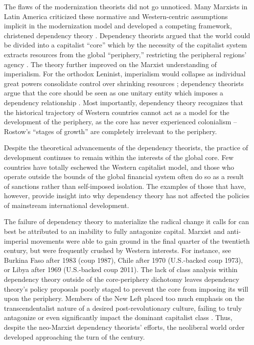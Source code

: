\documentclass{../../../coursework}
\begin{document}
The flaws of the modernization theorists did not go unnoticed. Many Marxists
in Latin America criticized these normative and Western-centric assumptions
implicit in the modernization model and developed a competing framework,
christened dependency theory \parencite{So1990}. Dependency theorists argued
that the world could be divided into a capitalist ``core'' which by the
necessity of the capitalist system extracts resources from the global
``periphery,'' restricting the peripheral regions' agency
\parencite{Frank1966}. The theory further improved on the Marxist
understanding of imperialism. For the orthodox Leninist, imperialism would
collapse as individual great powers consolidate control over shrinking
resources \parencite{Lenin1917}; dependency theorists argue that the core
should be seen as one unitary entity which imposes a dependency relationship
\parencite{Ferraro2008}. Most importantly, dependency theory recognizes that
the historical trajectory of Western countries cannot act as a model for the
development of the periphery, as the core has never experienced colonialism
\parencite{So1990} -- Rostow's ``stages of growth'' are completely irrelevant
to the periphery.

Despite the theoretical advancements of the dependency theorists, the practice
of development continues to remain within the interests of the global core.
Few countries have totally eschewed the Western capitalist model, and those
who operate outside the bounds of the global financial system often do so as a
result of sanctions rather than self-imposed isolation. The examples of those
that have, however, provide insight into why dependency theory has not
affected the policies of mainstream international development.

The failure of dependency theory to materialize the radical change it calls
for can best be attributed to an inability to fully antagonize capital.
Marxist and anti-imperial movements were able to gain ground in the final
quarter of the twentieth century, but were frequently crushed by Western
interests. For instance, see Burkina Faso after 1983 (coup 1987), Chile after
1970 (U.S.-backed coup 1973), or Libya after 1969 (U.S.-backed coup 2011).
The lack of class analysis within dependency theory outside of the
core-periphery dichotomy leaves dependency theory's policy proposals poorly
staged to prevent the core from imposing its will upon the periphery. Members
of the New Left placed too much emphasis on the transcendentalist nature of a
desired post-revolutionary culture, failing to truly antagonize or even
significantly impact the dominant capitalist class
\parencite[see][]{Schiff1973}. Thus, despite the neo-Marxist dependency
theorists' efforts, the neoliberal world order developed approaching the turn
of the century.
\end{document}
